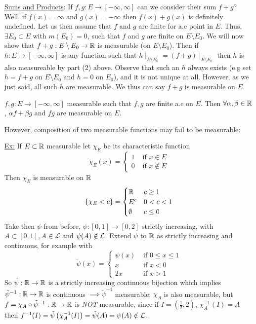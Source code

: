 \underline{Sums and Products}: If $f,g : E \rightarrow [-\infty, \infty]$ can we consider their sum $f+g$?
Well, if $f(x) = \infty$ and $g(x) = -\infty$ then $f(x) + g(x)$ is definitely undefined.
Let us then assume that $f$ and $g$ are finite for a.e point in $E$.
Thus, $\exists E_0 \subset E$ with $m(E_0) = 0$, such that $f$ and $g$ are finite on $E \setminus E_0$.
We will now show that $f+g: E \setminus E_0 \rightarrow \mathbb{R}$ is measurable (on $E\setminus E_0$).
Then if $h: E \rightarrow [-\infty, \infty]$ is any function such that $h \mid_{E\setminus E_0} = (f+g)\mid_{E\setminus E_0}$ then $h$ is also measureable by part (2) above.
Observe that such an $h$ always exists (e.g set $h = f+g$ on $E \setminus E_0$ and $h=0$ on $E_0$), and it is not unique at all.
However, as we just said, all such $h$ are measurable.
We thus can say $f+g$ is measurable on $E$.

\begin{prop}
    $f,g: E \rightarrow [-\infty, \infty]$ measurable such that $f,g$ are finite a.e on $E$.
    Then $\forall \alpha, \beta \in \mathbb{R}$, $\alpha f + \beta g$ and $f g$ are measurable on $E$.
\end{prop}

However, composition of two measurable functions may fail to be measurable:

\underline{Ex:} If $E \subset \mathbb{R}$ measurable let $\chi_{E}$ be its characteristic function
\[
    \chi_E (x) = \begin{cases}
                     1 & \text{ if } x \in E \\
                     0 & \text{ if } x \notin E
    \end{cases}
\]
Then $\chi_E$ is measurable on $\mathbb{R}$
\[
    \{ \chi_E < c \} = \begin{cases}
                           \mathbb{R} & c \geq 1 \\
                           E^c & 0 < c < 1 \\
                           \emptyset & c \leq 0
    \end{cases}
\]
Take then $\psi$ from before, $\psi: [0,1] \rightarrow [0,2]$ strictly increasing, with $A \subset [0,1], A \in \mathcal{L}$ and $\psi(A) \notin \mathcal{L}$.
Extend $\psi$ to $\mathbb{R}$ as strictly increasing and continuous, for example with
\[
    \tilde{\psi} (x) = \begin{cases}
                           \psi(x) & \text{ if } 0 \leq x \leq 1\\
                           x & \text{ if } x < 0 \\
                           2x & \text{ if } x > 1
    \end{cases}
\]
So $\tilde{\psi}: \mathbb{R} \rightarrow \mathbb{R}$ is a strictly increasing continuous bijection which implies $\tilde{\psi}^{-1}: \mathbb{R} \rightarrow \mathbb{R}$ is continuous $\implies \tilde{\psi}^{-1}$ measurable;
$\chi_A$ is also measurable, but $f = \chi_{A} \circ \tilde{\psi}^{-1} : \mathbb{R} \rightarrow \mathbb{R}$ is \emph{NOT} measurable, since if $I = \left( \frac{1}{2}, 2 \right)$, $\chi_{A}^{-1} (I) = A$ then $f^{-1}(I) = \tilde{\psi} \left( \chi_A ^{-1} (I) \right) = \tilde{\psi} (A) = \psi(A) \notin \mathcal{L}$.

